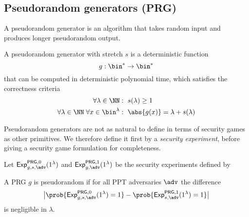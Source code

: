 \newpage
\subsection{Pseudorandom generators (PRG)}\label{ssec:PRG}
A pseudorandom generator is an algorithm that takes random input and produces longer pseudorandom output.

\begin{syntax}
  A pseudorandom generator with stretch $s$ is a deterministic function
  \[g:\bin^*\rightarrow\bin^*\]
  that can be computed in deterministic polynomial time, which satisfies the correctness criteria
  \begin{align*}
    \forall \lambda\in\NN                            & :\ s(\lambda)\geq 1              \\
    \forall \lambda\in\NN\; \forall x\in\bin^\lambda & :\ \abs{g(x)}=\lambda+s(\lambda) \\
  \end{align*}
\end{syntax}

Pseudorandom generators are not as natural to define in terms of security games as other primitives. We therefore define it first by a \emph{security experiment}, before giving a security game formulation for completeness.

\begin{security}[Pseudorandomness]
  \vspace{5mm}
  Let ${\mathsf{Exp}}_{g,s,\adv}^{\mathsf{PRG},0}(1^\lambda)$ and ${\mathsf{Exp}}_{g,\adv}^{\mathsf{PRG},1}(1^\lambda)$ be the security experiments defined by
  \begin{center}
    \begin{pchstack}
      \pchspace
    \end{pchstack}
  \end{center}
  A PRG $g$ is pseudorandom if for all PPT adversaries $\adv$ the difference
  \[ \big|\prob{{\mathsf{Exp}}_{g,s,\adv}^{\mathsf{PRG},0}(1^\lambda) = 1}
    - \prob{{\mathsf{Exp}}_{s,\adv}^{\mathsf{PRG},1}(1^\lambda) = 1}\big| \]
  is negligible in $\lambda$.
\end{security}


